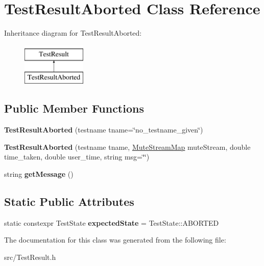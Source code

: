 \hypertarget{class_test_result_aborted}{\section{Test\-Result\-Aborted Class Reference}
\label{class_test_result_aborted}
}
Inheritance diagram for Test\-Result\-Aborted\-:\begin{figure}[H]
\begin{center}
\leavevmode
\includegraphics[height=2.000000cm]{class_test_result_aborted}
\end{center}
\end{figure}
\subsection*{Public Member Functions}
\begin{DoxyCompactItemize}
\item 
\hypertarget{class_test_result_aborted_a9468b7f934d8de430d4d1eeaf941dc63}{{\bfseries Test\-Result\-Aborted} (testname tname=\char`\"{}no\-\_\-testname\-\_\-given\char`\"{})}\label{class_test_result_aborted_a9468b7f934d8de430d4d1eeaf941dc63}

\item 
\hypertarget{class_test_result_aborted_a785319d12f26b1d0fca588984d74ff78}{{\bfseries Test\-Result\-Aborted} (testname tname, \hyperlink{class_mute_stream_map}{Mute\-Stream\-Map} mute\-Stream, double time\-\_\-taken, double user\-\_\-time, string msg=\char`\"{}\char`\"{})}\label{class_test_result_aborted_a785319d12f26b1d0fca588984d74ff78}

\item 
\hypertarget{class_test_result_aborted_a8827ae67e7129719cb9fda4252b7751c}{string {\bfseries get\-Message} ()}\label{class_test_result_aborted_a8827ae67e7129719cb9fda4252b7751c}

\end{DoxyCompactItemize}
\subsection*{Static Public Attributes}
\begin{DoxyCompactItemize}
\item 
\hypertarget{class_test_result_aborted_af116f6a895e41c51520328b3cb3b726e}{static constexpr Test\-State {\bfseries expected\-State} = Test\-State\-::\-A\-B\-O\-R\-T\-E\-D}\label{class_test_result_aborted_af116f6a895e41c51520328b3cb3b726e}

\end{DoxyCompactItemize}


The documentation for this class was generated from the following file\-:\begin{DoxyCompactItemize}
\item 
src/Test\-Result.\-h\end{DoxyCompactItemize}
